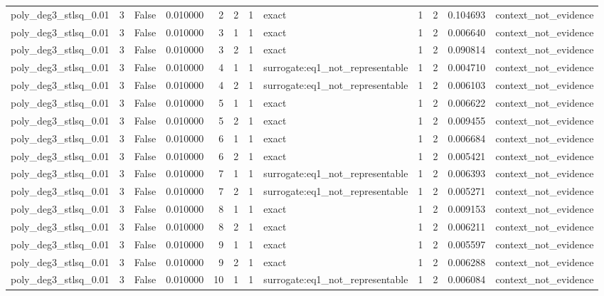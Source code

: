 \begin{tabular}{lrrrrrrlrrrl}
poly\_deg3\_stlsq\_0.01 & 3 & False & 0.010000 & 2 & 2 & 1 & exact & 1 & 2 & 0.104693 & context\_not\_evidence \\
poly\_deg3\_stlsq\_0.01 & 3 & False & 0.010000 & 3 & 1 & 1 & exact & 1 & 2 & 0.006640 & context\_not\_evidence \\
poly\_deg3\_stlsq\_0.01 & 3 & False & 0.010000 & 3 & 2 & 1 & exact & 1 & 2 & 0.090814 & context\_not\_evidence \\
poly\_deg3\_stlsq\_0.01 & 3 & False & 0.010000 & 4 & 1 & 1 & surrogate:eq1\_not\_representable & 1 & 2 & 0.004710 & context\_not\_evidence \\
poly\_deg3\_stlsq\_0.01 & 3 & False & 0.010000 & 4 & 2 & 1 & surrogate:eq1\_not\_representable & 1 & 2 & 0.006103 & context\_not\_evidence \\
poly\_deg3\_stlsq\_0.01 & 3 & False & 0.010000 & 5 & 1 & 1 & exact & 1 & 2 & 0.006622 & context\_not\_evidence \\
poly\_deg3\_stlsq\_0.01 & 3 & False & 0.010000 & 5 & 2 & 1 & exact & 1 & 2 & 0.009455 & context\_not\_evidence \\
poly\_deg3\_stlsq\_0.01 & 3 & False & 0.010000 & 6 & 1 & 1 & exact & 1 & 2 & 0.006684 & context\_not\_evidence \\
poly\_deg3\_stlsq\_0.01 & 3 & False & 0.010000 & 6 & 2 & 1 & exact & 1 & 2 & 0.005421 & context\_not\_evidence \\
poly\_deg3\_stlsq\_0.01 & 3 & False & 0.010000 & 7 & 1 & 1 & surrogate:eq1\_not\_representable & 1 & 2 & 0.006393 & context\_not\_evidence \\
poly\_deg3\_stlsq\_0.01 & 3 & False & 0.010000 & 7 & 2 & 1 & surrogate:eq1\_not\_representable & 1 & 2 & 0.005271 & context\_not\_evidence \\
poly\_deg3\_stlsq\_0.01 & 3 & False & 0.010000 & 8 & 1 & 1 & exact & 1 & 2 & 0.009153 & context\_not\_evidence \\
poly\_deg3\_stlsq\_0.01 & 3 & False & 0.010000 & 8 & 2 & 1 & exact & 1 & 2 & 0.006211 & context\_not\_evidence \\
poly\_deg3\_stlsq\_0.01 & 3 & False & 0.010000 & 9 & 1 & 1 & exact & 1 & 2 & 0.005597 & context\_not\_evidence \\
poly\_deg3\_stlsq\_0.01 & 3 & False & 0.010000 & 9 & 2 & 1 & exact & 1 & 2 & 0.006288 & context\_not\_evidence \\
poly\_deg3\_stlsq\_0.01 & 3 & False & 0.010000 & 10 & 1 & 1 & surrogate:eq1\_not\_representable & 1 & 2 & 0.006084 & context\_not\_evidence \\

\end{tabular}
